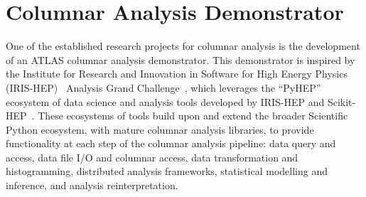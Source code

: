 \section{Columnar Analysis Demonstrator}\label{sec:demonstrator}

One of the established research projects for columnar analysis is the development of an ATLAS columnar analysis demonstrator.
This demonstrator is inspired by the Institute for Research and Innovation in Software for High Energy Physics (IRIS-HEP)~\cite{S2I2HEPSP,CWPDOC} Analysis Grand Challenge~\cite{Held:2022sfw}, which leverages the ``PyHEP'' ecosystem of data science and analysis tools developed by IRIS-HEP and Scikit-HEP~\cite{Rodrigues:2020syo}.
These ecosystems of tools build upon and extend the broader Scientific Python ecosystem, with mature columnar analysis libraries, to provide functionality at each step of the columnar analysis pipeline: data query and access, data file I/O and columnar access, data transformation and histogramming, distributed analysis frameworks, statistical modelling and inference, and analysis reinterpretation.

